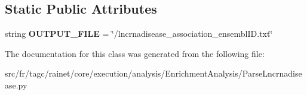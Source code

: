 \subsection*{Static Public Attributes}
\begin{DoxyCompactItemize}
\item 
\hypertarget{classsrc_1_1fr_1_1tagc_1_1rainet_1_1core_1_1execution_1_1analysis_1_1EnrichmentAnalysis_1_1Parsecb1def1c78d4bf507f73f324ea473dbb_af9c3933e61982113211b48fe1030176b}{string {\bfseries O\-U\-T\-P\-U\-T\-\_\-\-F\-I\-L\-E} = \char`\"{}/lncrnadisease\-\_\-association\-\_\-ensembl\-I\-D.\-txt\char`\"{}}\label{classsrc_1_1fr_1_1tagc_1_1rainet_1_1core_1_1execution_1_1analysis_1_1EnrichmentAnalysis_1_1Parsecb1def1c78d4bf507f73f324ea473dbb_af9c3933e61982113211b48fe1030176b}

\end{DoxyCompactItemize}


The documentation for this class was generated from the following file\-:\begin{DoxyCompactItemize}
\item 
src/fr/tagc/rainet/core/execution/analysis/\-Enrichment\-Analysis/Parse\-Lncrnadisease.\-py\end{DoxyCompactItemize}
